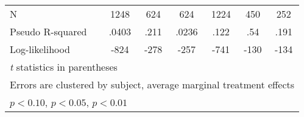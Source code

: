 \begin{table}[htbp]
\begin{tabular}{l*{6}{c}}
N               &     1248         &      624         &      624         &     1224         &      450         &      252         \\
Pseudo R-squared&    .0403         &     .211         &    .0236         &     .122         &      .54         &     .191         \\
Log-likelihood  &     -824         &     -278         &     -257         &     -741         &     -130         &     -134         \\
\hline\hline
\multicolumn{7}{l}{\footnotesize \textit{t} statistics in parentheses}\\
\multicolumn{7}{l}{\footnotesize Errors are clustered by subject, average marginal treatment effects}\\
\multicolumn{7}{l}{\footnotesize \sym{*} \(p<0.10\), \sym{**} \(p<0.05\), \sym{***} \(p<0.01\)}\\
\end{tabular}
\end{table}
